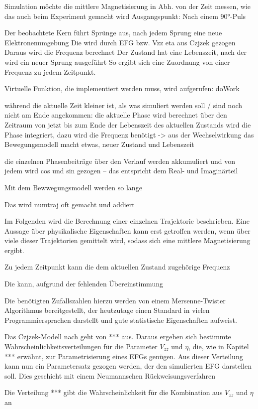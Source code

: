 Simulation möchte die mittlere Magnetisierung in Abh. von der Zeit messen, wie das auch beim Experiment gemacht wird
Ausgangspunkt: Nach einem 90°-Puls 


Der beobachtete Kern führt Sprünge aus, nach jedem Sprung eine neue Elektronenumgebung
Die wird durch EFG bzw. Vzz eta aus Czjzek gezogen
Daraus wird die Frequenz berechnet
Der Zustand hat eine Lebenszeit, nach der wird ein neuer Sprung ausgeführt
So ergibt sich eine Zuordnung von einer Frequenz zu jedem Zeitpunkt.


Virtuelle Funktion, die implementiert werden muss, wird aufgerufen: doWork


während die aktuelle Zeit kleiner ist, als was simuliert werden soll / sind noch nicht am Ende angekommen:
    die aktuelle Phase wird berechnet
    über den Zeitraum von jetzt bis zum Ende der Lebenszeit des aktuellen Zustands wird die Phase integriert, dazu wird die Frequenz benötigt -> aus der Wechselwirkung
    das Bewegungsmodell macht etwas, neuer Zustand und Lebenszeit

die einzelnen Phasenbeiträge über den Verlauf werden akkumuliert und von jedem wird cos und sin gezogen -- das entspricht dem Real- und Imaginärteil


Mit dem Bewwegungsmodell werden so lange 






Das wird numtraj oft gemacht und addiert



Im Folgenden wird die Berechnung einer einzelnen Trajektorie beschrieben. Eine Aussage über physikalische Eigenschaften kann erst getroffen werden, wenn über viele dieser Trajektorien gemittelt wird, sodass sich eine mittlere Magnetisierung ergibt.


Zu jedem Zeitpunkt kann die dem aktuellen Zustand zugehörige Frequenz 







Die kann, aufgrund der fehlenden Übereinstimmung 



Die benötigten Zufallszahlen hierzu werden von einem Mersenne-Twister Algorithmus bereitgestellt, der heutzutage einen Standard in vielen Programmiersprachen darstellt und gute statistische Eigenschaften aufweist.



Das Czjzek-Modell nach \cite{} geht von *** aus. Daraus ergeben sich bestimmte Wahrscheinlichkeitsverteilungen für die Parameter $V_{zz}$ und $\eta$, die, wie in Kapitel *** erwähnt, zur Parametrisierung eines EFGs genügen. Aus dieser Verteilung kann nun ein Parametersatz gezogen werden, der den simulierten EFG darstellen soll. Dies geschieht mit einem Neumannschen Rückweisungsverfahren

Die Verteilung *** gibt die Wahrscheinlichkeit für die Kombination aus $V_{zz}$ und $\eta$ an

